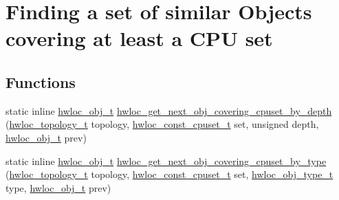 \hypertarget{a00056}{
\section{Finding a set of similar Objects covering at least a CPU set}
\label{a00056}
}
\subsection*{Functions}
\begin{DoxyCompactItemize}
\item 
static inline \hyperlink{a00016}{hwloc\_\-obj\_\-t} \hyperlink{a00056_ga2f9a4ec15e9cfae8c21501257a51ce5b}{hwloc\_\-get\_\-next\_\-obj\_\-covering\_\-cpuset\_\-by\_\-depth} (\hyperlink{a00039_ga9d1e76ee15a7dee158b786c30b6a6e38}{hwloc\_\-topology\_\-t} topology, \hyperlink{a00040_ga1f784433e9b606261f62d1134f6a3b25}{hwloc\_\-const\_\-cpuset\_\-t} set, unsigned depth, \hyperlink{a00016}{hwloc\_\-obj\_\-t} prev)
\item 
static inline \hyperlink{a00016}{hwloc\_\-obj\_\-t} \hyperlink{a00056_ga5915ea30f326676b3a4cfff371ce04d1}{hwloc\_\-get\_\-next\_\-obj\_\-covering\_\-cpuset\_\-by\_\-type} (\hyperlink{a00039_ga9d1e76ee15a7dee158b786c30b6a6e38}{hwloc\_\-topology\_\-t} topology, \hyperlink{a00040_ga1f784433e9b606261f62d1134f6a3b25}{hwloc\_\-const\_\-cpuset\_\-t} set, \hyperlink{a00041_gacd37bb612667dc437d66bfb175a8dc55}{hwloc\_\-obj\_\-type\_\-t} type, \hyperlink{a00016}{hwloc\_\-obj\_\-t} prev)
\end{DoxyCompactItemize}


